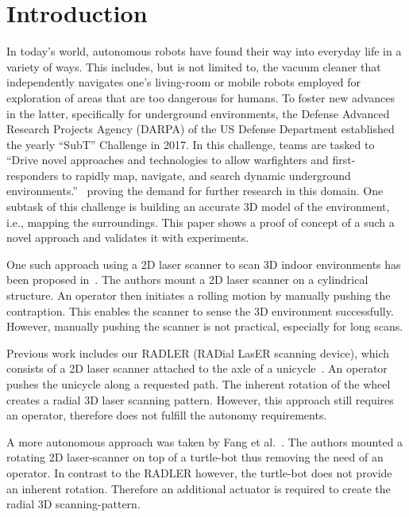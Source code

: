 \section{Introduction}
\label{sec:introduction}

In today's world, autonomous robots have found their way into everyday life in a variety of ways. 
This includes, but is not limited to, the vacuum cleaner that independently navigates one's living-room or mobile robots employed for exploration of areas that are too dangerous for humans.
To foster new advances in the latter, specifically for underground environments, the  Defense Advanced Research Projects Agency (DARPA) of the US Defense Department established the yearly ``SubT'' Challenge in 2017.
In this challenge, teams are tasked to ``Drive novel approaches and technologies to allow warfighters and first-responders to rapidly map, navigate, and search dynamic underground environments.''~\cite{allen} proving the demand for further research in this domain.
One subtask of this challenge is building an accurate 3D model of the environment, i.e., mapping the surroundings. 
This paper shows a proof of concept of a such a novel approach and validates it with experiments.

One such approach using a 2D laser scanner to scan 3D indoor environments has been proposed in~\cite{classical_mechanics_scanner}.
The authors mount a 2D laser scanner on a cylindrical structure.
An operator then initiates a rolling motion by manually pushing the contraption.
This enables the scanner to sense the 3D environment successfully.
However, manually pushing the scanner is not practical, especially for long scans.

Previous work includes our RADLER (RADial LasER scanning device), which consists of a 2D laser scanner attached to the axle of a unicycle~\cite{ISER2018}.
An operator pushes the unicycle along a requested path.
The inherent rotation of the wheel creates a radial 3D laser scanning pattern.
However, this approach still requires an operator, therefore does not fulfill the autonomy requirements. 

A more autonomous approach was taken by Fang et al.~\cite{3D_per_2D_based}.
The authors mounted a rotating 2D laser-scanner on top of a turtle-bot thus removing the need of an operator.
In contrast to the RADLER however, the turtle-bot does not provide an inherent rotation.
Therefore an additional actuator is required to create the radial 3D scanning-pattern. 

